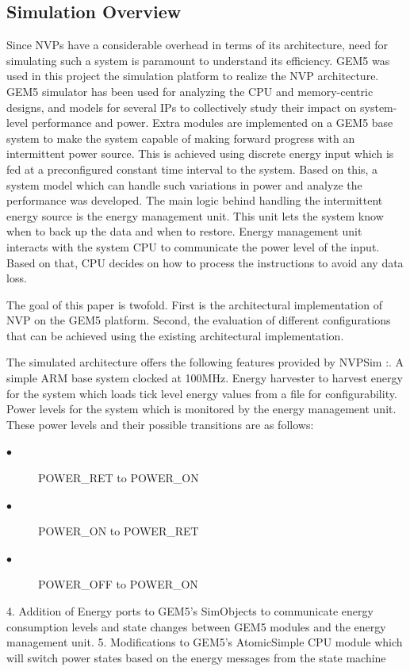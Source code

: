 \documentclass[conference]{IEEEtran}
\begin{document}
 \subsection{Simulation Overview}
 Since NVPs have a considerable overhead in terms of its architecture, need for simulating such a system is paramount to understand its efficiency. GEM5 was used in this project the simulation platform to realize the NVP architecture. GEM5 simulator has been used for analyzing the CPU and memory-centric designs, and models for several IPs to collectively study their impact on system-level performance and power. Extra modules are implemented on a GEM5 base system to make the system capable of making forward progress with an intermittent power source. This is achieved using discrete energy input which is fed at a preconfigured constant time interval to the system. Based on this, a system model which can handle such variations in power and analyze the performance was developed. The main logic behind handling the intermittent energy source is the energy management unit. This unit lets the system know when to back up the data and when to restore. Energy management unit interacts with the system CPU to communicate the power level of the input. Based on that, CPU decides on how to process the instructions to avoid any data loss.
 
\vspace{5 mm}

The goal of this paper is twofold. First is the architectural implementation of NVP on the GEM5 platform. Second, the evaluation of different configurations that can be achieved using the existing architectural implementation. 
\vspace{5 mm}

The simulated architecture offers the following features provided by NVPSim \cite{b1}:. A simple ARM base system clocked at 100MHz. Energy harvester to harvest energy for the system which loads tick level energy values from a file for configurability. Power levels for the system which is monitored by the energy management unit. These power levels and their possible transitions are as follows:
\begin{description}
  \item[$\bullet$] POWER\_RET to POWER\_ON
  \item[$\bullet$] POWER\_ON to POWER\_RET
  \item[$\bullet$] POWER\_OFF to POWER\_ON
\end{description}
4. Addition of Energy ports to GEM5's SimObjects to communicate energy consumption levels and state changes between GEM5 modules and the energy management unit.
5. Modifications to GEM5's AtomicSimple CPU module which will switch power states based on the energy messages from the state machine
\end{document}
